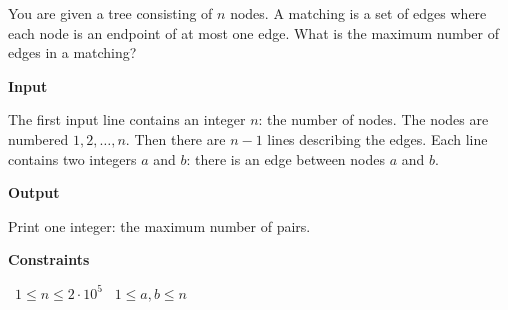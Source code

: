 You are given a tree consisting of $n$ nodes.
A matching is a set of edges where each node is an endpoint of at most one edge. What is the maximum number of edges in a matching?

\vspace{0.3cm}\noindent\textbf{Input}

The first input line contains an integer $n$: the number of nodes. The nodes are numbered $1,2,\ldots,n$.
Then there are $n-1$ lines describing the edges. Each line contains two integers $a$ and $b$: there is an edge between nodes $a$ and $b$.

\vspace{0.3cm}\noindent\textbf{Output}

Print one integer: the maximum number of pairs.

\vspace{0.3cm}\noindent\textbf{Constraints}

\textbullet\ $1 \le n \le 2 \cdot 10^5$
\textbullet\ $1 \le a,b \le n$